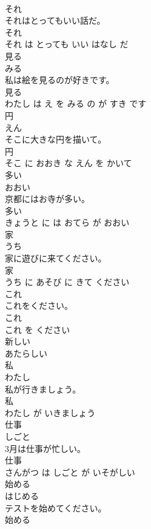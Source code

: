 \documentclass[8pt]{extreport}
\begin{document}
\begin{CJK}{UTF8}{min}
\\	それ	
\\	それはとってもいい話だ。	
\\	それ 
\\	それ は とっても いい はなし だ			
\\	見る	
\\	みる			
\\	私は絵を見るのが好きです。	
\\	見る 
\\	わたし は え を みる の が すき です			
\\	円	
\\	えん			
\\	そこに大きな円を描いて。	
\\	円 
\\	そこ に おおき な えん を かいて			
\\	多い	
\\	おおい			
\\	京都にはお寺が多い。	
\\	多い 
\\	きょうと に は おてら が おおい			
\\	家	
\\	うち			
\\	家に遊びに来てください。	
\\	家 
\\	うち に あそび に きて ください			
\\	これ	
\\	これをください。	
\\	これ 
\\	これ を ください			
\\	新しい	
\\	あたらしい			
\\	私	
\\	わたし			
\\	私が行きましょう。	
\\	私 
\\	わたし が いきましょう			
\\	仕事	
\\	しごと			
\\	3月は仕事が忙しい。	
\\	仕事 
\\	さんがつ は しごと が いそがしい			
\\	始める	
\\	はじめる			
\\	テストを始めてください。	
\\	始める 

\end{CJK}
\end{document}
